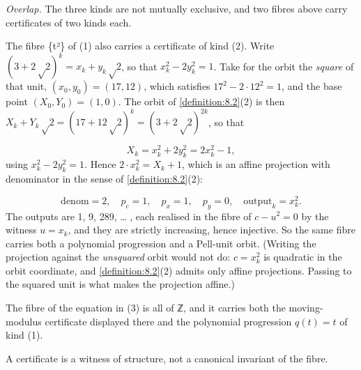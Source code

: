 \documentclass[11pt]{article}
\theoremstyle{plain}
\theoremstyle{definition}
\theoremstyle{remark}
\theoremstyle{plain}
\theoremstyle{definition}
\theoremstyle{remark}
\theoremstyle{plain}
\theoremstyle{definition}
\theoremstyle{remark}
\begin{document}
\emph{Overlap.} The three kinds are not mutually exclusive, and two fibres above carry certificates of two kinds each.

The fibre \{t²\} of (1) also carries a certificate of kind (2). Write $(3 + 2√2)^{k} = x_{k} + y_{k}√2$, so that $x_{k}^{2} − 2y_{k}^{2} = 1$. Take for the orbit the \emph{square} of that unit, $(x_{0}, y_{0}) = (17, 12)$, which satisfies $17^{2} − 2·12^{2} = 1$, and the base point $(X_{0}, Y_{0}) = (1, 0)$. The orbit of \cref{definition:8.2}(2) is then $X_{k} + Y_{k}√2 = (17 + 12√2)^{k} = (3 + 2√2)^{2k}$, so that

\[
X_{k} = x_{k}^{2} + 2y_{k}^{2} = 2x_{k}^{2} − 1,
\]
using $x_{k}^{2} − 2y_{k}^{2} = 1$. Hence $2·x_{k}^{2} = X_{k} + 1$, which is an affine projection with denominator in the sense of \cref{definition:8.2}(2):

\[
\text{denom} = 2, \quad p_{c} = 1, \quad p_{x} = 1, \quad p_{y} = 0, \quad \text{output}_{k} = x_{k}^{2}.
\]
The outputs are 1, 9, 289, … , each realised in the fibre of $c − u^{2} = 0$ by the witness $u = x_{k}$, and they are strictly increasing, hence injective. So the same fibre carries both a polynomial progression and a Pell-unit orbit. (Writing the projection against the \emph{unsquared} orbit would not do: $c = x_{k}^{2}$ is quadratic in the orbit coordinate, and \cref{definition:8.2}(2) admits only affine projections. Passing to the squared unit is what makes the projection affine.)

The fibre of the equation in (3) is all of ℤ, and it carries both the moving-modulus certificate displayed there and the polynomial progression $q(t) = t$ of kind (1).

A certificate is a witness of structure, not a canonical invariant of the fibre.
\end{document}
